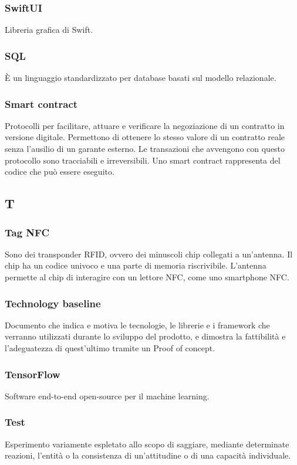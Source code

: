 \subsubsection*{SwiftUI} Libreria grafica di Swift.
\subsubsection*{SQL} È un linguaggio standardizzato per database basati sul modello relazionale.
\subsubsection*{Smart contract} Protocolli per facilitare, attuare e verificare la negoziazione di un contratto in versione digitale.
Permettono di ottenere lo stesso valore di un contratto reale senza l'ausilio di un garante esterno. Le transazioni che avvengono con questo protocollo sono tracciabili e irreversibili. Uno smart contract rappresenta del codice che può essere eseguito.
\subsection*{T}
\subsubsection*{Tag NFC} Sono dei transponder RFID, ovvero dei minuscoli chip collegati a un'antenna. Il chip ha un codice univoco e una parte di memoria riscrivibile. L'antenna permette al chip di interagire con un lettore NFC, come uno smartphone NFC.
\subsubsection*{Technology baseline} Documento che indica e motiva le tecnologie, le librerie e
i framework che verranno utilizzati durante lo sviluppo del prodotto, e dimostra la fattibilità e l'adeguatezza di quest'ultimo tramite un Proof of concept.
\subsubsection*{TensorFlow} Software end-to-end open-source per il machine learning.
\subsubsection*{Test} Esperimento variamente espletato allo scopo di saggiare, mediante determinate reazioni, l'entità o la consistenza di un'attitudine o di una capacità individuale.
